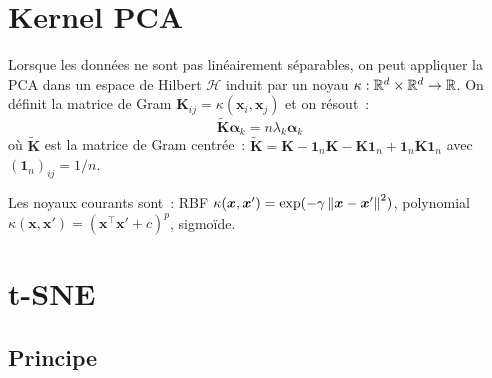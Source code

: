 \section{Kernel PCA}
\label{sec:kpca}

\begin{definition}
Lorsque les donn\'ees ne sont pas lin\'eairement s\'eparables, on peut
appliquer la PCA dans un espace de Hilbert $\mathcal{H}$ induit par un noyau
$\kappa : \mathbb{R}^d \times \mathbb{R}^d \to \mathbb{R}$. On d\'efinit la matrice de Gram
$\bm{K}_{ij} = \kappa(\bm{x}_i, \bm{x}_j)$ et on r\'esout~:
\begin{equation}
  \tilde{\bm{K}} \bm{\alpha}_k = n \lambda_k \bm{\alpha}_k
\end{equation}
o\`u $\tilde{\bm{K}}$ est la matrice de Gram centr\'ee~:
$\tilde{\bm{K}} = \bm{K} - \bm{1}_n \bm{K} - \bm{K} \bm{1}_n +
\bm{1}_n \bm{K} \bm{1}_n$ avec $(\bm{1}_n)_{ij} = 1/n$.
\end{definition}

\begin{remarque}
Les noyaux courants sont~: RBF $\kappa(\bm{x}, \bm{x}') = \exp(-\gamma
\left\| \bm{x} - \bm{x}' \right\|^2)$, polynomial $\kappa(\bm{x}, \bm{x}') =
(\bm{x}^\top \bm{x}' + c)^p$, sigmo\"ide.
\end{remarque}

\section{t-SNE}
\label{sec:tsne}

\subsection{Principe}

